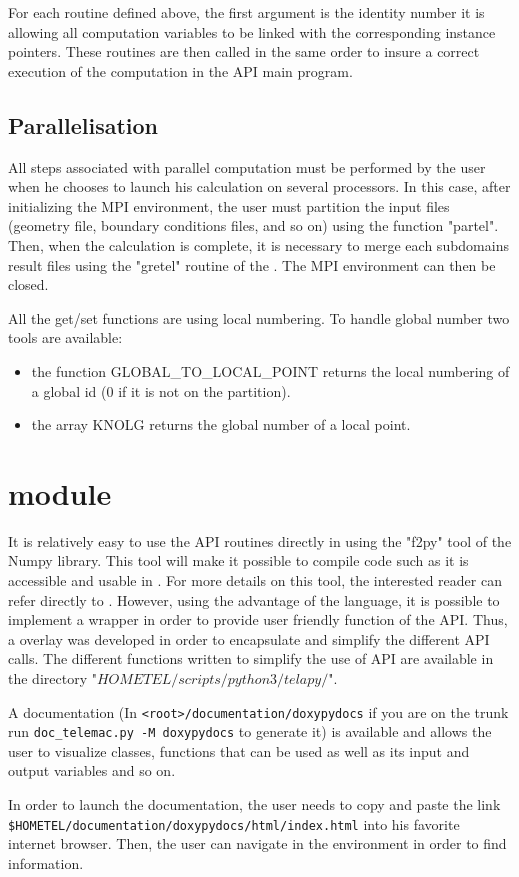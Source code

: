 For each routine defined above, the first argument is the identity number it is
allowing all computation variables to be linked with the corresponding instance
pointers. These routines are then called in the same order to insure a correct
execution of the computation in the API main program.

\subsection{Parallelisation}
\label{subsec:para}
All steps associated with parallel computation must be performed by the user
when he chooses to launch his calculation on several processors. In this case,
after initializing the MPI environment, the user must partition the input files
(geometry file, boundary conditions files, and so on) using the \fortran{}
function "partel". Then, when the calculation is complete, it is necessary to
merge each subdomains result files using the "gretel" routine of the
\telemacsystem{}. The MPI environment can then be closed.

All the get/set functions are using local numbering.
To handle global number two tools are available:
\begin{itemize}
  \item the function GLOBAL\_TO\_LOCAL\_POINT returns the local numbering of a global id
(0 if it is not on the partition).
  \item the array KNOLG returns the global number of a local point.
\end{itemize}

\section{\TelApy{} \python{} module}

It is relatively easy to use the \fortran{} API routines directly in \python{} using
the "f2py" tool of the \python{} Numpy library. This tool will make it possible
to compile \fortran{} code such as it is accessible and usable in \python{}. For more
details on this tool, the interested reader can refer directly to
\cite{Peterson2009}. However, using the advantage of the \python{} language, it
is possible to implement a wrapper in order to provide user friendly function
of the \fortran{} API\@. Thus, a \python{} overlay was developed in order to
encapsulate and simplify the different API \python{} calls. The different \python{}
functions written to simplify the use of API are available in the directory
"$HOMETEL/scripts/python3/telapy/$".

A \doxygen documentation (In \verb!<root>/documentation/doxypydocs! if you are on the
trunk run \verb!doc_telemac.py -M doxypydocs! to generate it) is available and allows
the user to visualize \python{} classes, functions that can be used as well as
its input and output variables and so on.

In order to launch the \doxygen documentation, the user needs to copy and paste
the link \verb!$HOMETEL/documentation/doxypydocs/html/index.html! into his
favorite internet browser. Then, the user can navigate in the \doxygen
environment in order to find information.
